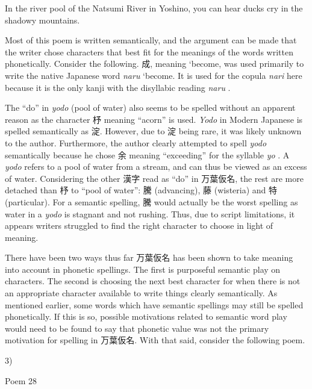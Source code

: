 \par{\emph{}In the river pool of the Natsumi River in Yoshino, you can hear ducks cry in the shadowy mountains. }

\par{ Most of this poem is written semantically, and the argument can be made that the writer chose characters that best fit for the meanings of the words written phonetically. Consider the following. 成, meaning ‘become\textquotesingle , was used primarily to write the native Japanese word \emph{naru }‘become\textquotesingle . It is used for the copula \emph{nari }here because it is the only kanji with the disyllabic reading \emph{naru }. }

\par{ The “do” in \emph{yodo }(pool of water) also seems to be spelled without an apparent reason as the character 杼 meaning “acorn” is used. \emph{Yodo }in Modern Japanese is spelled semantically as 淀. However, due to 淀 being rare, it was likely unknown to the author. Furthermore, the author clearly attempted to spell \emph{yodo }semantically because he chose 余 meaning “exceeding” for the syllable \emph{yo }. A \emph{yodo }refers to a pool of water from a stream, and can thus be viewed as an excess of water. Considering the other 漢字 read as “do” in 万葉仮名, the rest are more detached than 杼 to “pool of water”: 騰 (advancing), 藤 (wisteria) and 特 (particular). For a semantic spelling, 騰 would actually be the worst spelling as water in a \emph{yodo }is stagnant and not rushing. Thus, due to script limitations, it appears writers struggled to find the right character to choose in light of meaning. }

\par{ There have been two ways thus far 万葉仮名 has been shown to take meaning into account in phonetic spellings. The first is purposeful semantic play on characters. The second is choosing the next best character for when there is not an appropriate character available to write things clearly semantically. As mentioned earlier, some words which have semantic spellings may still be spelled phonetically. If this is so, possible motivations related to semantic word play would need to be found to say that phonetic value was not the primary motivation for spelling in 万葉仮名. With that said, consider the following poem. }

\par{3) }

\par{Poem 28 }

